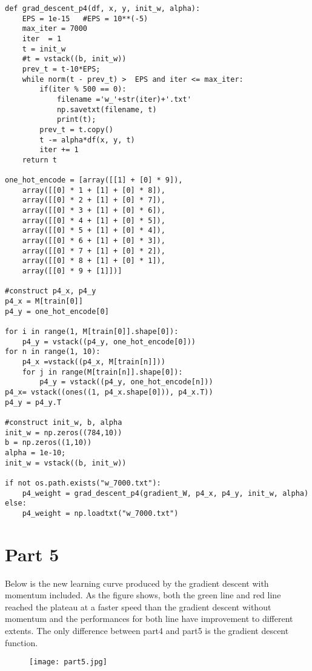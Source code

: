 \documentclass{article}
\begin{document}
\Large\begin{lstlisting}[basicstyle=\large\ttfamily]
def grad_descent_p4(df, x, y, init_w, alpha):
    EPS = 1e-15   #EPS = 10**(-5)
    max_iter = 7000
    iter  = 1
    t = init_w
    #t = vstack((b, init_w)) 
    prev_t = t-10*EPS;
    while norm(t - prev_t) >  EPS and iter <= max_iter:
        if(iter % 500 == 0):
            filename ='w_'+str(iter)+'.txt'
            np.savetxt(filename, t)
            print(t);
        prev_t = t.copy()
        t -= alpha*df(x, y, t)
        iter += 1
    return t

one_hot_encode = [array([[1] + [0] * 9]),
    array([[0] * 1 + [1] + [0] * 8]),
    array([[0] * 2 + [1] + [0] * 7]),
    array([[0] * 3 + [1] + [0] * 6]),
    array([[0] * 4 + [1] + [0] * 5]),
    array([[0] * 5 + [1] + [0] * 4]),
    array([[0] * 6 + [1] + [0] * 3]),
    array([[0] * 7 + [1] + [0] * 2]),
    array([[0] * 8 + [1] + [0] * 1]),
    array([[0] * 9 + [1]])]

#construct p4_x, p4_y
p4_x = M[train[0]]
p4_y = one_hot_encode[0]

for i in range(1, M[train[0]].shape[0]):
    p4_y = vstack((p4_y, one_hot_encode[0]))
for n in range(1, 10):
    p4_x =vstack((p4_x, M[train[n]]))
    for j in range(M[train[n]].shape[0]):
        p4_y = vstack((p4_y, one_hot_encode[n]))
p4_x= vstack((ones((1, p4_x.shape[0])), p4_x.T))
p4_y = p4_y.T

#construct init_w, b, alpha
init_w = np.zeros((784,10))
b = np.zeros((1,10))
alpha = 1e-10;
init_w = vstack((b, init_w))

if not os.path.exists("w_7000.txt"):
    p4_weight = grad_descent_p4(gradient_W, p4_x, p4_y, init_w, alpha)
else:
    p4_weight = np.loadtxt("w_7000.txt")
\end{lstlisting}


\section*{Part 5}
Below is the new learning curve produced by the gradient descent with momentum included. As the figure shows, both the green line and red line reached the plateau at a faster speed than the gradient descent without momentum and the performances for both line have improvement to different extents. The only difference between part4 and part5 is the gradient descent function.
\begin{figure}[!htb]
  \texttt{[image: part5.jpg]}
  \caption*{}\label{fig:part4}
\end{figure}
\end{document}

